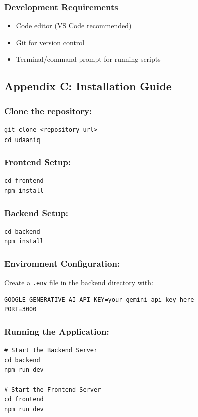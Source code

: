 \documentclass[12pt, conference]{IEEEtran}
\begin{document}
\subsubsection*{Development Requirements}
\begin{itemize}
    \item Code editor (VS Code recommended)
    \item Git for version control
    \item Terminal/command prompt for running scripts
\end{itemize}

\subsection*{Appendix C: Installation Guide}

\subsubsection*{Clone the repository:}
\begin{verbatim}
git clone <repository-url>
cd udaaniq
\end{verbatim}

\subsubsection*{Frontend Setup:}
\begin{verbatim}
cd frontend
npm install
\end{verbatim}

\subsubsection*{Backend Setup:}
\begin{verbatim}
cd backend
npm install
\end{verbatim}

\subsubsection*{Environment Configuration:}
Create a \texttt{.env} file in the backend directory with:
\begin{verbatim}
GOOGLE_GENERATIVE_AI_API_KEY=your_gemini_api_key_here
PORT=3000
\end{verbatim}

\subsubsection*{Running the Application:}
\begin{verbatim}
# Start the Backend Server
cd backend
npm run dev

# Start the Frontend Server
cd frontend
npm run dev
\end{verbatim}
\end{document}
